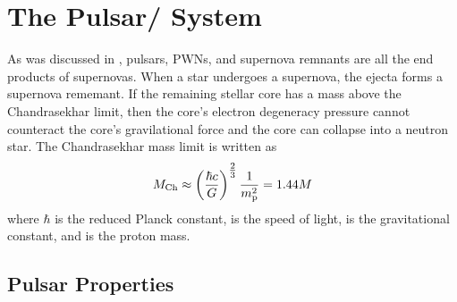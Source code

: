 \section{The Pulsar/ System}

As was discussed in , pulsars, 
\acp{PWN},
and supernova remnants are all the end products of supernovas.  When a
star undergoes a supernova, the ejecta forms a supernova rememant.  If the
remaining stellar core has a mass above the Chandrasekhar limit,
then the core's electron degeneracy pressure cannot counteract the core's
gravilational force and the core can collapse into a neutron star.
The Chandrasekhar mass limit is written as \citep{chandrasekhar_1931_maximum-ideal}
\begin{equation}
  M_\text{Ch} \approx \left(\frac{\hbar c}{G}\right)^{\tfrac{2}{3}}
  \frac{1}{m_\text{p}^2}
  = 1.44 M
\end{equation}
where $\hbar$ is the reduced Planck constant, \speedoflight
is the speed of light, \gravitationalconstant is the gravitational
constant, and \protonmass is the proton mass.



\subsection{Pulsar Properties}








